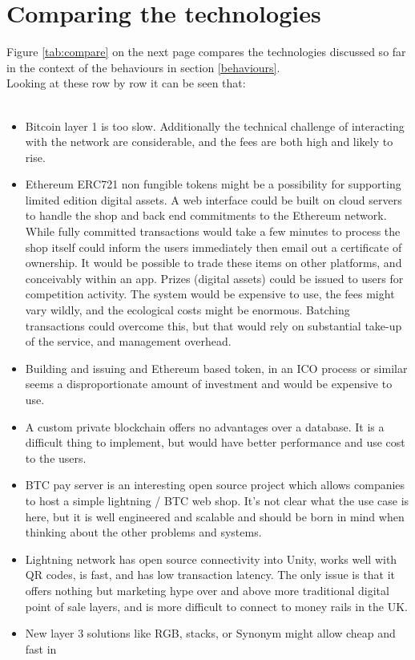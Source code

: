 \section{Comparing the technologies}
Figure \ref{tab:compare} on the next page compares the technologies discussed so far in the context of the behaviours in section \ref{behaviours}. \\
Looking at these row by row it can be seen that:\\\
\begin{itemize}
\item Bitcoin layer 1 is too slow. Additionally the technical challenge of interacting with the network are considerable, and the fees are both high and likely to rise.
\item Ethereum ERC721 non fungible tokens might be a possibility for supporting limited edition digital assets. A web interface could be built on cloud servers to handle the shop and back end commitments to the Ethereum network. While fully committed transactions would take a few minutes to process the shop itself could inform the users immediately then email out a certificate of ownership. It would be possible to trade these items on other platforms, and conceivably within an app. Prizes (digital assets) could be issued to users for competition activity. The system would be expensive to use, the fees might vary wildly, and the ecological costs might be enormous. Batching transactions could overcome this, but that would rely on substantial take-up of the service, and management overhead.
\item Building and issuing and Ethereum based token, in an ICO process or similar seems a disproportionate amount of investment and would be expensive to use. 
\item A custom private blockchain offers no advantages over a database. It is a difficult thing to implement, but would have better performance and use cost to the users.
\item BTC pay server is an interesting open source project which allows companies to host a simple lightning / BTC web shop. It's not clear what the use case is here, but it is well engineered and scalable and should be born in mind when thinking about the other problems and systems.
\item Lightning network has open source connectivity into Unity, works well with QR codes, is fast, and has low transaction latency. The only issue is that it offers nothing but marketing hype over and above more traditional digital point of sale layers, and is more difficult to connect to money rails in the UK.
\item New layer 3 solutions like RGB, stacks, or Synonym might allow cheap and fast in
\end{itemize}

